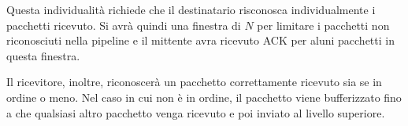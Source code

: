 \documentclass{book}
\begin{document}
Questa individualit{\`a} richiede che il destinatario risconosca
individualmente i pacchetti ricevuto. Si avr{\`a} quindi una finestra di $N$
per limitare i pacchetti non riconosciuti nella pipeline e il mittente avra
ricevuto ACK per aluni pacchetti in questa finestra.

Il ricevitore, inoltre, riconoscer{\`a} un pacchetto correttamente ricevuto
sia se in ordine o meno. Nel caso in cui non {\`e} in ordine, il pacchetto
viene bufferizzato fino a che qualsiasi altro pacchetto venga ricevuto e poi
inviato al livello superiore.

{}
\end{document}
